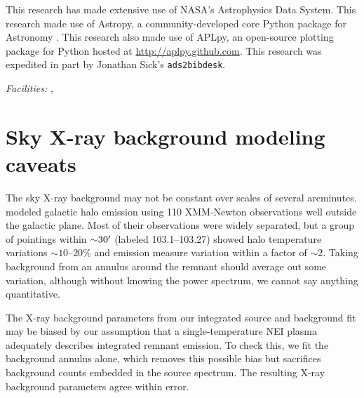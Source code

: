 \documentclass[preprint2,tighten,trackchanges]{aastex6}
\newcommand*{\abt}{\mathord{\sim}} %
\begin{document}
This research has made extensive use of NASA's Astrophysics Data System.
This research made use of Astropy, a community-developed core Python package
for Astronomy \citep{astropy2013}.
This research also made use of APLpy, an open-source plotting package for
Python hosted at \href{http://aplpy.github.com}{http://aplpy.github.com}.
This research was expedited in part by Jonathan Sick's \texttt{ads2bibdesk}.

{\it Facilities:} , 






\newpage
\clearpage  %
\appendix

\setcounter{table}{0}
\renewcommand{\thetable}{A\arabic{table}}
\setcounter{figure}{0}
\renewcommand{\thefigure}{A\arabic{figure}}

\section{Sky X-ray background modeling caveats}

The sky X-ray background may not be constant over scales of several arcminutes.
\citet{henley2013} modeled galactic halo emission using 110 XMM-Newton
observations well outside the galactic plane.
Most of their observations were widely separated, but a group of pointings
within $\abt 30\arcmin$ (labeled 103.1--103.27) showed halo temperature
variations $\abt 10$--$20\%$ and emission measure variation within a factor of
$\abt 2$.
Taking background from an annulus around the remnant should average out some
variation, although without knowing the power spectrum, we cannot say anything
quantitative.

The X-ray background parameters from our integrated source and background fit
may be biased by our assumption that a single-temperature NEI plasma adequately
describes integrated remnant emission.
To check this, we fit the background annulus alone, which removes this possible
bias but sacrifices background counts embedded in the source spectrum.
The resulting X-ray background parameters agree within error.
\end{document}
